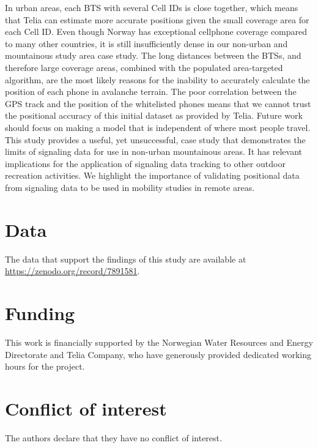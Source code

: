 \documentclass[authordate,empirical]{jote-new-article}
\begin{document}
In urban areas, each BTS with several Cell IDs is close together, which means that Telia can estimate more accurate positions given the small coverage area for each Cell ID. Even though Norway has exceptional cellphone coverage compared to many other countries, it is still insufficiently dense in our non-urban and mountainous study area case study. The long distances between the BTSs, and therefore large coverage areas, combined with the populated area-targeted algorithm, are the most likely reasons for the inability to accurately calculate the position of each phone in avalanche terrain. The poor correlation between the GPS track and the position of the whitelisted phones means that we cannot trust the positional accuracy of this initial dataset as provided by Telia. Future work should focus on making a model that is independent of where most people travel. This study provides a useful, yet unsuccessful, case study that demonstrates the limits of signaling data for use in non-urban mountainous areas. It has relevant implications for the application of signaling data tracking to other outdoor recreation activities. We highlight the importance of validating positional data from signaling data to be used in mobility studies in remote areas.




\section{Data}

The data that support the findings of this study are available at \url{https://zenodo.org/record/7891581}.


\section{Funding}
This work is financially supported by the Norwegian Water Resources and Energy Directorate and Telia Company, who have generously provided dedicated working hours for the project.

\section{Conflict of interest}
The authors declare that they have no conflict of interest.


\printbibliography
\end{document}
